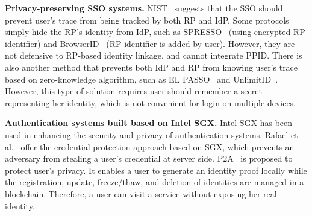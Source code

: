 \vspace{1mm}\noindent\textbf{Privacy-preserving SSO systems.} NIST~\cite{NIST2017draft} suggests that the SSO should prevent user's trace from being tracked by both RP and IdP. 
Some protocols simply hide the RP's identity from IdP, such as SPRESSO~\cite{SPRESSO} (using encrypted RP identifier) and BrowserID~\cite{BrowserID} (RP identifier is added by user). However,  they are not defensive to RP-based identity linkage, and cannot integrate PPID. 
There is also another method that prevents both IdP and RP from knowing user's trace based on zero-knowledge algorithm, such as EL PASSO~\cite{ZhangKSZR21} and UnlimitID~\cite{IsaakidisHD16}. However, this type of solution requires user should remember a secret representing her identity, which is not convenient for login on multiple devices.



\vspace{1mm}\noindent\textbf{Authentication systems built based on Intel SGX.} Intel SGX has been used in enhancing the security and privacy of authentication systems. Rafael et al.~\cite{CondeMW18} offer the credential protection approach based on SGX, which prevents an adversary from stealing a user's credential at server side. P2A~\cite{SongWLOWL20} is proposed to protect user's privacy. It enables a user to generate an identity proof locally while the registration, update, freeze/thaw, and deletion of identities are managed in a blockchain. Therefore, a user can visit a service without exposing her real identity. 

